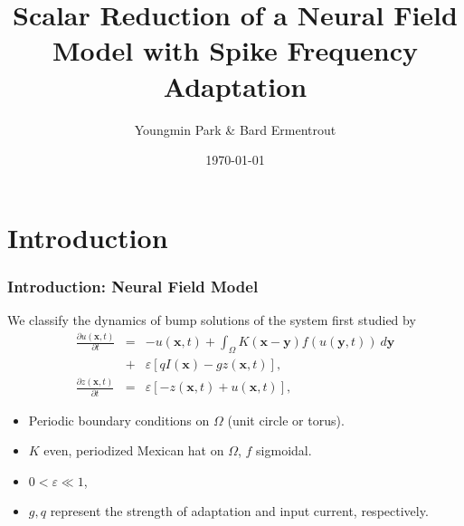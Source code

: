\documentclass{beamer}
\title[Scalar Reduction of a Neural Field]{Scalar Reduction of a Neural Field Model with Spike Frequency Adaptation} %
\author[Y. Park \& G.B. Ermentrout]{Youngmin Park \& Bard Ermentrout} %
\institute[U Pitt]%
{
University of Pittsburgh Department of Mathematics\\ %
\medskip
\textit{yop6@pitt.edu} %
}
\date{\today} %
\newcommand{\x}{\mathbf{x}}
\newcommand{\y}{\mathbf{y}}
\newcommand{\io}{\int_\Omega}
\newcommand{\ve}{\varepsilon}
\begin{document}
\begin{frame}
\titlepage %
\end{frame}
% 



\section{Introduction}




\begin{frame}
\frametitle{Introduction: Neural Field Model}
We classify the dynamics of bump solutions of the system first studied by \cite{pinto_ermentrout_2001_siam}
\begin{eqnarray}
\label{eq:u1}
\frac{\partial u(\x,t)}{\partial t} &=& -u(\x,t) + \io K(\x-\y) f(u(\y,t))\ d\y  \\
{} &+& \ve[q I(\x) - g z(\x,t)] \nonumber, \\
\label{eq:z1}
\frac{\partial z(\x,t)}{\partial t} &=& \ve [-z(\x,t)+u(\x,t)],
\end{eqnarray}

\begin{itemize}
 \item<1-> Periodic boundary conditions on $\Omega$ (unit circle or torus).
 \item<2-> $K$ even, periodized Mexican hat on $\Omega$, $f$ sigmoidal.
 \item<3-> $0 < \varepsilon \ll 1$, 
 \item<4-> $g,q$ represent the strength of adaptation and input current, respectively.
\end{itemize}

\end{frame}
\end{document}
